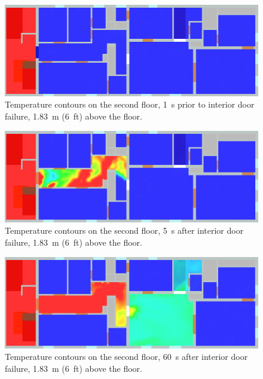 \documentclass[12pt,oneside]{book}
\begin{document}
\begin{figure}[!ht]
\centering
\includegraphics[width=.68\textwidth]{../Figures/west_50th_baseline_top_159_6ft}
 

\caption[Temperature contours on the second floor, 1~s prior to interior door failure.]
{Temperature contours on the second floor, 1~s prior to interior door failure, 1.83~m (6~ft) above the floor.}
\label{fig:temp_top_159}
\end{figure}

\begin{figure}[!ht]
\centering
\includegraphics[width=.68\textwidth]{../Figures/west_50th_baseline_top_165_6ft}
 

\caption[Temperature contours on the second floor, 5~s after interior door failure.]
{Temperature contours on the second floor, 5~s after interior door failure, 1.83~m (6~ft) above the floor.}
\label{fig:temp_top_165}
\end{figure}

\begin{figure}[!ht]
\centering
\includegraphics[width=.68\textwidth]{../Figures/west_50th_baseline_top_220_6ft}
 

\caption[Temperature contours on the second floor, 60~s after interior door failure.]
{Temperature contours on the second floor, 60~s after interior door failure, 1.83~m (6~ft) above the floor.}
\label{fig:temp_top_220}
\end{figure}
\end{document}

